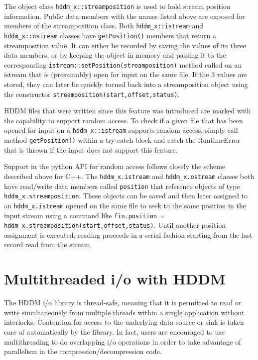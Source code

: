 \documentclass{revtex4}
\begin{document}
The object class \texttt{hddm\_x::streamposition} is used to hold stream
position information. Public data members with the names listed above are
exposed for members of the streamposition class. Both \texttt{hddm\_x::istream}
and \texttt{hddm\_x::ostream} classes have \texttt{getPosition()} members that
return a streamposition value. It can either be recorded by saving the values
of its three data members, or by keeping the object in memory and passing it
to the corresponding \texttt{istream::setPosition(streamposition)} method
called on an istream that is (presumably) open for input on the same file.
If the 3 values are stored, they can later be quickly turned back into a
streamposition object using the constructor 
\texttt{streamposition(start,offset,status)}.

HDDM files that were written since this feature was introduced are marked
with the capability to support random access. To check if a given file that
has been opened for input on a \texttt{hddm\_x::istream} supports random access,
simply call method \texttt{getPosition()} within a try-{}catch block and catch
the RuntimeError that is thrown if the input does not support this feature.

Support in the python API for random access follows closely the scheme
described above for C++. The \texttt{hddm\_x.istream} and 
\texttt{hddm\_x.ostream} classes both have read/write data members called
\texttt{position} that reference objects of type \texttt{hddm\_x.streamposition}.
These objects can be saved and then later assigned to an
\texttt{hddm\_x.istream} opened on the same file to seek to the same position
in the input stream using a command like
\texttt{fin.position = hddm\_x.streamposition(start,offset,status)}. Until
another position assignment is executed, reading proceeds in a serial
fashion starting from the last record read from the stream.

\section{Multithreaded i/o with HDDM}

The HDDM i/o library is thread-safe, meaning that it is permitted to read
or write simultaneously from multiple threads within a single application
without interlocks. Contention for access to the underlying data source or
sink is taken care of automatically by the library. In fact, users are
encouraged to use multithreading to do overlapping i/o operations in order
to take advantage of parallelism in the compression/decompression code.
\end{document}
